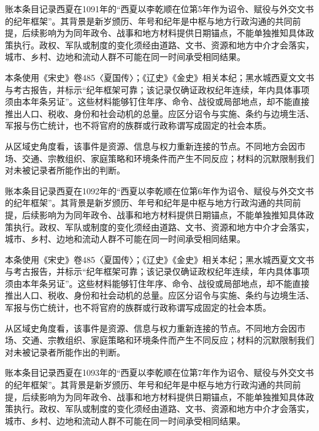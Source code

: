 账本条目记录西夏在1091年的“西夏以李乾顺在位第5年作为诏令、赋役与外交文书的纪年框架”。其背景是新岁颁历、年号和纪年是中枢与地方行政沟通的共同前提，后续影响为为同年政令、战事和地方材料提供日期锚点，不能单独推知具体政策执行。政权、军队或制度的变化须经由道路、文书、资源和地方中介才会落实，城市、乡村、边地和流动人群不可能在同一时间承受相同结果。

本条使用《宋史》卷485〈夏国传〉；《辽史》《金史》相关本纪；黑水城西夏文文书与考古报告，并标示“纪年框架可靠；该记录仅确证政权纪年连续，年内具体事项须由本年条另证”。这些材料能够钉住年序、命令、战役或局部地点，却不能直接推出人口、税收、身份和社会动机的总量。应区分诏令与实施、条约与边境生活、军报与伤亡统计，也不将官府的族群或行政称谓写成固定的社会本质。

从区域史角度看，该事件是资源、信息与权力重新连接的节点。不同地方会因市场、交通、宗教组织、家庭策略和环境条件而产生不同反应；材料的沉默限制我们对未被记录者所能作出的判断。

账本条目记录西夏在1092年的“西夏以李乾顺在位第6年作为诏令、赋役与外交文书的纪年框架”。其背景是新岁颁历、年号和纪年是中枢与地方行政沟通的共同前提，后续影响为为同年政令、战事和地方材料提供日期锚点，不能单独推知具体政策执行。政权、军队或制度的变化须经由道路、文书、资源和地方中介才会落实，城市、乡村、边地和流动人群不可能在同一时间承受相同结果。

本条使用《宋史》卷485〈夏国传〉；《辽史》《金史》相关本纪；黑水城西夏文文书与考古报告，并标示“纪年框架可靠；该记录仅确证政权纪年连续，年内具体事项须由本年条另证”。这些材料能够钉住年序、命令、战役或局部地点，却不能直接推出人口、税收、身份和社会动机的总量。应区分诏令与实施、条约与边境生活、军报与伤亡统计，也不将官府的族群或行政称谓写成固定的社会本质。

从区域史角度看，该事件是资源、信息与权力重新连接的节点。不同地方会因市场、交通、宗教组织、家庭策略和环境条件而产生不同反应；材料的沉默限制我们对未被记录者所能作出的判断。

账本条目记录西夏在1093年的“西夏以李乾顺在位第7年作为诏令、赋役与外交文书的纪年框架”。其背景是新岁颁历、年号和纪年是中枢与地方行政沟通的共同前提，后续影响为为同年政令、战事和地方材料提供日期锚点，不能单独推知具体政策执行。政权、军队或制度的变化须经由道路、文书、资源和地方中介才会落实，城市、乡村、边地和流动人群不可能在同一时间承受相同结果。

